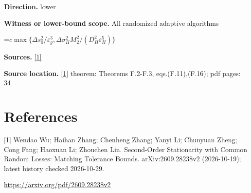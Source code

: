 \documentclass[10pt,a4paper]{article}
\newcommand{\AtlasMath}[1]{\par\begingroup\centering\setbox0=\hbox{$\displaystyle #1$}\ifdim\wd0>1.4\linewidth\typeout{ATLAS WIDE FORMULA: \the\wd0}\fi\ifdim\wd0>\linewidth\resizebox{\linewidth}{!}{\box0}\else\box0\fi\par\endgroup}
\begin{document}
\textbf{Direction.} lower

\textbf{Witness or lower-bound scope.} All randomized adaptive algorithms

\AtlasMath{c\max\{\Delta s_0^2/\varepsilon_g^3,\Delta\sigma_H^2M_2^2/(D_H^2\varepsilon_H^5)\}}
\textbf{Sources.} \href{https://arxiv.org/pdf/2609.28238v2}{[1]}

\textbf{Source location.} \href{https://arxiv.org/pdf/2609.28238v2}{[1]} theorem: Theorems F.2-F.3, eqs.(F.11),(F.16); pdf pages: 34

\section{References}
[1] Wendao Wu; Haihan Zhang; Chenheng Zhang; Yanyi Li; Chunyuan Zheng; Cong Fang; Haoxuan Li; Zhouchen Lin. Second-Order Stationarity with Common Random Losses: Matching Tolerance Bounds. arXiv:2609.28238v2 (2026-10-19); latest history checked 2026-10-29.

\url{https://arxiv.org/pdf/2609.28238v2}
\end{document}
